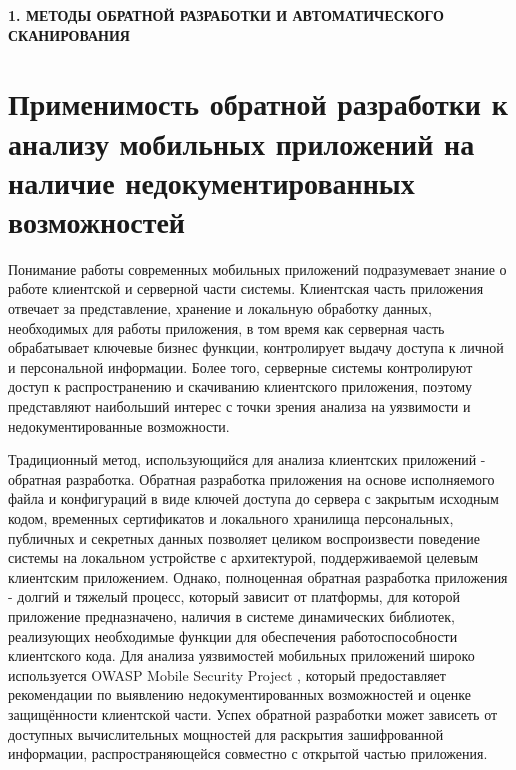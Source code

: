 \newpage
\begin{center}
  \textbf{\large 1. МЕТОДЫ ОБРАТНОЙ РАЗРАБОТКИ И АВТОМАТИЧЕСКОГО СКАНИРОВАНИЯ}
\end{center}


\section{Применимость обратной разработки к анализу мобильных приложений на наличие недокументированных возможностей}

Понимание работы современных мобильных приложений подразумевает знание о работе клиентской и серверной части системы. Клиентская часть приложения отвечает за представление, хранение и локальную обработку данных, необходимых для работы приложения, в том время как серверная часть обрабатывает ключевые бизнес функции, контролирует выдачу доступа к личной и персональной информации. Более того, серверные системы контролируют доступ к распространению и скачиванию клиентского приложения, поэтому представляют наибольший интерес с точки зрения анализа на уязвимости и недокументированные возможности.
 
Традиционный метод, использующийся для анализа клиентских приложений - обратная разработка. Обратная разработка приложения на основе исполняемого файла и конфигураций в виде ключей доступа до сервера с закрытым исходным кодом, временных сертификатов и локального хранилища персональных, публичных и секретных данных позволяет целиком воспроизвести поведение системы на локальном устройстве с архитектурой, поддерживаемой целевым клиентским приложением. Однако, полноценная обратная разработка приложения - долгий и тяжелый процесс, который зависит от платформы, для которой приложение предназначено, наличия в системе динамических библиотек, реализующих необходимые функции для обеспечения работоспособности клиентского кода. Для анализа уязвимостей мобильных приложений широко используется OWASP Mobile Security Project \cite{owasp_mobile_security_project}, который предоставляет рекомендации по выявлению недокументированных возможностей и оценке защищённости клиентской части. Успех обратной разработки может зависеть от доступных вычислительных мощностей для раскрытия зашифрованной информации, распространяющейся совместно с открытой частью приложения.


